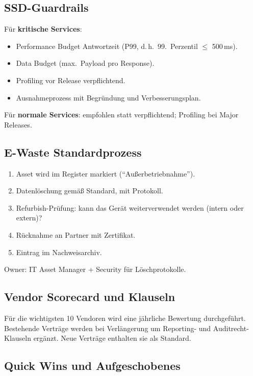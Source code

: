 \documentclass[11pt,a4paper,oneside]{article}
\begin{document}
\subsection{SSD-Guardrails}

Für \textbf{kritische Services}:

\begin{itemize}
  \item Performance Budget Antwortzeit (P99, d.\,h.\ 99.\ Perzentil $\leq$ 500\,ms).
  \item Data Budget (max.\ Payload pro Response).
  \item Profiling vor Release verpflichtend.
  \item Ausnahmeprozess mit Begründung und Verbesserungsplan.
\end{itemize}

Für \textbf{normale Services}: empfohlen statt verpflichtend; Profiling bei Major Releases.

\subsection{E-Waste Standardprozess}

\begin{enumerate}
  \item Asset wird im Register markiert (``Außerbetriebnahme'').
  \item Datenlöschung gemäß Standard, mit Protokoll.
  \item Refurbish-Prüfung: kann das Gerät weiterverwendet werden (intern oder extern)?
  \item Rücknahme an Partner mit Zertifikat.
  \item Eintrag im Nachweisarchiv.
\end{enumerate}

Owner: IT Asset Manager + Security für Löschprotokolle.

\subsection{Vendor Scorecard und Klauseln}

Für die wichtigsten 10 Vendoren wird eine jährliche Bewertung durchgeführt. Bestehende Verträge werden bei Verlängerung um Reporting- und Auditrecht-Klauseln ergänzt. Neue Verträge enthalten sie als Standard.

\subsection{Quick Wins und Aufgeschobenes}
\end{document}
